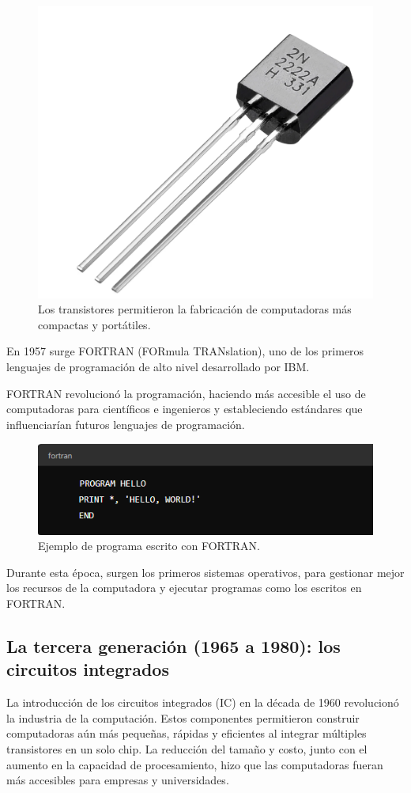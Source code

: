 \begin{figure}[H]
	\centering
	\includegraphics[width=0.4\linewidth]{Imagenes/transistor.png}
	\caption{Los transistores permitieron la fabricación de computadoras más compactas y portátiles.}
	\label{fig:enter-label}
\end{figure}

En 1957 surge FORTRAN (FORmula TRANslation), uno de los primeros lenguajes de programación de alto nivel desarrollado por IBM.

FORTRAN revolucionó la programación, haciendo más accesible el uso de computadoras para científicos e ingenieros y estableciendo estándares que influenciarían futuros lenguajes de programación.

\begin{figure}[H]
	\centering
	\includegraphics[width=0.8\linewidth]{Imagenes/fortran.png}
	\caption{Ejemplo de programa escrito con FORTRAN.}
	\label{fig:enter-label}
\end{figure}
Durante esta época, surgen  los primeros sistemas operativos, para  gestionar mejor los recursos de la computadora y ejecutar programas como los escritos en FORTRAN.





\subsection{La tercera generación (1965 a 1980): los circuitos integrados}

La introducción de los circuitos integrados (IC) en la década de 1960 revolucionó la industria de la computación. Estos componentes permitieron construir computadoras aún más pequeñas, rápidas y eficientes al integrar múltiples transistores en un solo chip. La reducción del tamaño y costo, junto con el aumento en la capacidad de procesamiento, hizo que las computadoras fueran más accesibles para empresas y universidades.

